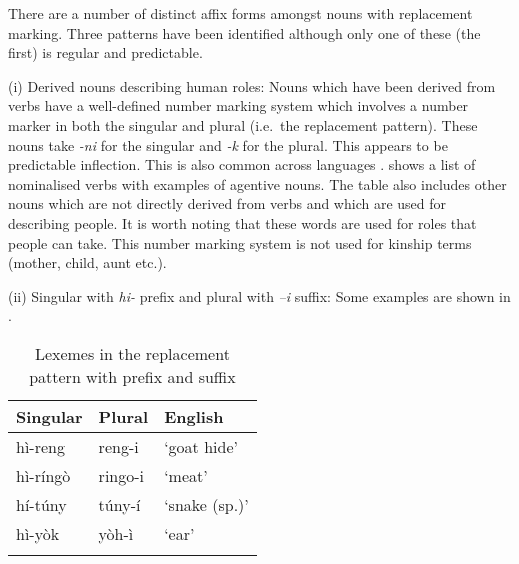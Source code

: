 \documentclass[output=paper]{langsci/langscibook}
\begin{document}
There are a number of distinct affix forms amongst nouns with replacement marking. Three patterns have been identified although only one of these (the first) is regular and predictable.

(i) Derived nouns describing human roles: Nouns which have been derived from verbs have a well-defined number marking system which involves a number marker in both the singular and plural (i.e.\ the replacement pattern). These nouns take \textit{-ni }for the singular and \textit{-k} for the plural. This appears to be predictable inflection. This is also common across  languages \citep[243]{Dimmendaal2000}.  shows a list of nominalised verbs with examples of agentive nouns. The table also includes other nouns which are not directly derived from verbs and which are used for describing people. It is worth noting that these words are used for roles that people can take. This number marking system is not used for kinship terms (mother, child, aunt etc.). 

\begin{table}
\caption{Person referent nouns in singular and plural}
\label{tab:moodie:14}
\end{table}

(ii) Singular with \textit{hi-} prefix and plural with \textit{–i} suffix: Some examples are shown in . 

\begin{table}

\begin{tabularx}{.66\textwidth}{XXX}
\lsptoprule

 {Singular} & {Plural} & {English}\\ \midrule
 hì-reng &  reng-i & ‘goat hide’\\
 hì-ríngò &  ringo-i & ‘meat’\\
 hí-túny &  túny-í & ‘snake (sp.)’\\
 hì-yòk &  yòh-ì & ‘ear’\\
\lspbottomrule
\end{tabularx}
\caption{Lexemes in the replacement pattern with prefix and suffix}
\label{tab:moodie:15}
\end{table}
\end{document}
